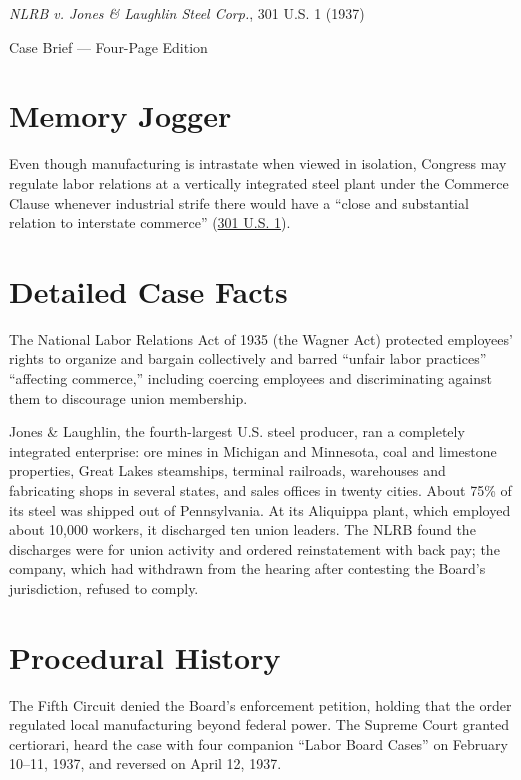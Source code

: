 \documentclass[12pt]{article}
\begin{document}
\begin{center}
{\LARGE \textit{NLRB v. Jones \& Laughlin Steel Corp.}, 301 U.S. 1 (1937)\par}
\vspace{0.8em}
{\large Case Brief --- Four-Page Edition\par}
\end{center}
\vspace{1em}

\section{Memory Jogger}

Even though manufacturing is intrastate when viewed in isolation, Congress may regulate labor relations at a vertically integrated steel plant under the Commerce Clause whenever industrial strife there would have a ``close and substantial relation to interstate commerce'' (\href{https://supreme.justia.com/cases/federal/us/301/1/}{301 U.S. 1}).

\section{Detailed Case Facts}

The National Labor Relations Act of 1935 (the Wagner Act) protected employees' rights to organize and bargain collectively and barred ``unfair labor practices'' ``affecting commerce,'' including coercing employees and discriminating against them to discourage union membership.

Jones \& Laughlin, the fourth-largest U.S. steel producer, ran a completely integrated enterprise: ore mines in Michigan and Minnesota, coal and limestone properties, Great Lakes steamships, terminal railroads, warehouses and fabricating shops in several states, and sales offices in twenty cities. About 75\% of its steel was shipped out of Pennsylvania. At its Aliquippa plant, which employed about 10,000 workers, it discharged ten union leaders. The NLRB found the discharges were for union activity and ordered reinstatement with back pay; the company, which had withdrawn from the hearing after contesting the Board's jurisdiction, refused to comply.

\section{Procedural History}

The Fifth Circuit denied the Board's enforcement petition, holding that the order regulated local manufacturing beyond federal power. The Supreme Court granted certiorari, heard the case with four companion ``Labor Board Cases'' on February 10--11, 1937, and reversed on April 12, 1937.
\end{document}
